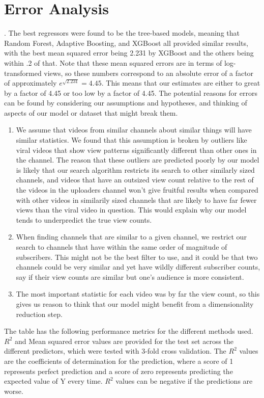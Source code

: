\documentclass[12pt]{article}
\theoremstyle{definition}
\theoremstyle{remark}
\begin{document}
\section{Error Analysis}
.
The best regressors were found to be the tree-based models, meaning that Random
Forest, Adaptive Boosting, and XGBoost all provided similar results, with the
best mean squared error being 2.231 by XGBoost and the others being within .2 of
that. Note that these mean squared errors are in terms of log-transformed views,
so these numbers correspond to an absolute error of a factor of approximately
$e^{\sqrt{2.231}}=4.45$. This means that our estimates are either to great by a
factor of 4.45 or too low by a factor of 4.45. The potential reasons for errors
can be found by considering our assumptions and hypotheses, and thinking of
aspects of our model or dataset that might break them.
\begin{enumerate}
\item We assume that videos from similar channels about similar things will have
  similar statistics. We found that this assumption is broken by outliers like
  viral videos that show view patterns significantly different than other ones
  in the channel. The reason that these outliers are predicted poorly by our
  model is likely that our search algorithm restricts its search to other
  similarly sized channels, and videos that have an outsized view count relative
  to the rest of the videos in the uploaders channel won't give fruitful results
  when compared with other videos in similarily sized channels that are likely
  to have far fewer views than the viral video in question. This would explain
  why our model tends to underpredict the true view counts.
\item When finding channels that are similar to a given channel, we restrict our
  search to channels that have within the same order of magnitude of
  subscribers. This might not be the best filter to use, and it could be that
  two channels could be very similar and yet have wildly different subscriber
  counts, say if their view counts are similar but one's audience is more
  consistent.
\item The most important statistic for each video was by far the view count, so
  this gives us reason to think that our model might benefit from a
  dimensionality reduction step.
\end{enumerate}

The table has the following performance metrics for the different methods used.
$R^2$ and Mean squared error values are provided for the test set across the
different predictors, which were tested with 3-fold cross validation. The $R^2$
values are the coefficients of determination for the prediction, where a score
of 1 represents perfect prediction and a score of zero represents predicting the
expected value of Y every time. $R^2$ values can be negative if the predictions
are worse.
\end{document}
